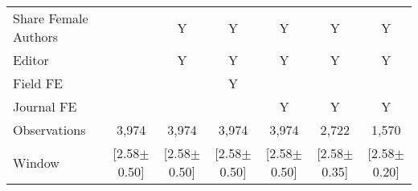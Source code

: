 \begin{tabular}{l*{6}{c}}
Share Female Authors &         &        Y&        Y&        Y&        Y&        Y\\
Editor          &         &        Y&        Y&        Y&        Y&        Y\\
Field FE        &         &         &        Y&         &         &         \\
Journal FE      &         &         &         &        Y&        Y&        Y\\
\hline
Observations    &    3,974&    3,974&    3,974&    3,974&    2,722&    1,570\\
Window          &[2.58$\pm$0.50]&[2.58$\pm$0.50]&[2.58$\pm$0.50]&[2.58$\pm$0.50]&[2.58$\pm$0.35]&[2.58$\pm$0.20]\\
\hline\hline
\end{tabular}
